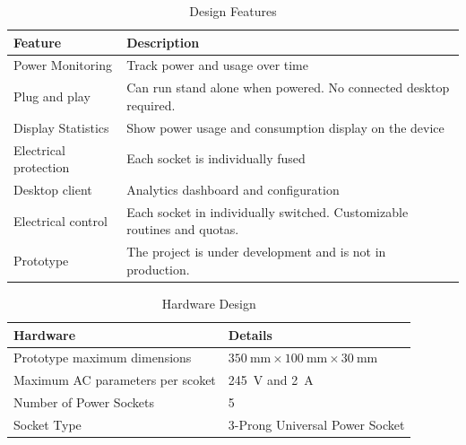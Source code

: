 \documentclass[conference, a4paper]{IEEEtran}
\begin{document}
\begin{table}[tbh]

  \centering
  \caption{Design Features}
  \label{tbl:design_features}
  \begin{tabular}{p{}p{}}

      \toprule
      \textbf{Feature} & \textbf{Description}\\
      \midrule
      Power Monitoring & Track power and usage over time \\
      Plug and play & Can run stand alone when powered. No connected desktop required. \\
      Display Statistics & Show power usage and consumption display on the device  \\
      Electrical protection & Each socket is individually fused \\
      Desktop client & Analytics dashboard and configuration \\
      Electrical control & Each socket in individually switched. Customizable routines and quotas. \\
      Prototype & The project is under development and is not in production.\\

      \bottomrule
  \end{tabular}
\end{table}

\begin{table}[tbh]

  \centering
  \caption{Hardware Design}
  \label{tbl:hardware_design}
  \begin{tabular}{ll}

      \toprule
      \textbf{Hardware} & \textbf{Details}\\
      \midrule
      Prototype maximum dimensions & $ \SI{350}{\milli\meter}  \times \SI{100}{\milli\meter} \times \SI{30}{\milli\meter}$ \\
      Maximum AC parameters per scoket & \SI{245}{\volt} and \SI{2}{\ampere} \\
      Number of Power Sockets  & 5 \\
      Socket Type & 3-Prong Universal Power Socket \\

      \bottomrule
  \end{tabular}
\end{table}
\end{document}
